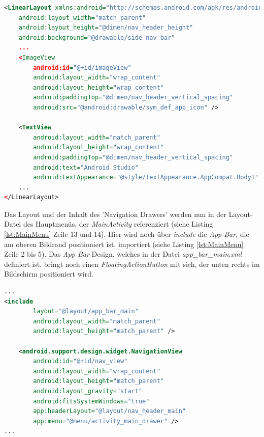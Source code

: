 \begin{lstlisting}[caption=Definition des Headers des 'Navigation Drawers' in der Datei \textit{nav\_header\_main.xml}, label=lst:DrawerHeader, language=XML]
<LinearLayout xmlns:android="http://schemas.android.com/apk/res/android"
    android:layout_width="match_parent"
    android:layout_height="@dimen/nav_header_height"
    android:background="@drawable/side_nav_bar"    
    ...
    <ImageView
        android:id="@+id/imageView"
        android:layout_width="wrap_content"
        android:layout_height="wrap_content"
        android:paddingTop="@dimen/nav_header_vertical_spacing"
        android:src="@android:drawable/sym_def_app_icon" />

    <TextView
        android:layout_width="match_parent"
        android:layout_height="wrap_content"
        android:paddingTop="@dimen/nav_header_vertical_spacing"
        android:text="Android Studio"
        android:textAppearance="@style/TextAppearance.AppCompat.Body1" />
    ...
</LinearLayout>
\end{lstlisting} 

Das Layout und der Inhalt des 'Navigation Drawers' werden nun in der Layout-Datei des Hauptmenüs, der \textit{MainActivity} referenziert (siehe Listing \ref{lst:MainMenu} Zeile 13 und 14). Hier wird noch über \textit{include} die \textit{App Bar}, die am oberen Bildrand positioniert ist, importiert (siehe Listing \ref{lst:MainMenu} Zeile 2 bis 5). Das \textit{App Bar} Design, welches in der Datei \textit{app\_bar\_main.xml} definiert ist, bringt noch einen \textit{FloatingActionButton} mit sich, der unten rechts im Bildschirm positioniert wird. 

\begin{lstlisting}[caption=Layout des Hauptmenüs in der Datei \textit{activity\_main.xml}, label=lst:MainMenu, language=XML]
...
<include
        layout="@layout/app_bar_main"
        android:layout_width="match_parent"
        android:layout_height="match_parent" />

    <android.support.design.widget.NavigationView
        android:id="@+id/nav_view"
        android:layout_width="wrap_content"
        android:layout_height="match_parent"
        android:layout_gravity="start"
        android:fitsSystemWindows="true"
        app:headerLayout="@layout/nav_header_main"
        app:menu="@menu/activity_main_drawer" />
...
\end{lstlisting} 

